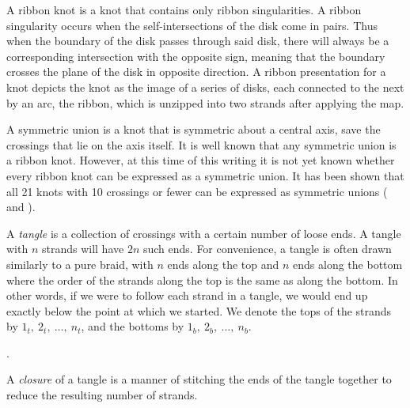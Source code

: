 \begin{paper}

A ribbon knot is a knot that contains only ribbon singularities.
A ribbon singularity occurs when the self-intersections of the disk come in
pairs.
Thus when the boundary of the disk passes through said disk, there will always
be a corresponding intersection with the opposite sign, meaning that the
boundary crosses the plane of the disk in opposite direction.
A ribbon presentation for a knot depicts the knot as the image of a series
of disks, each connected to the next by an arc, the ribbon, which is unzipped
into two strands after applying the map.

A symmetric union is a knot that is symmetric about a central axis, save the
crossings that lie on the axis itself.
It is well known that any symmetric union is a ribbon knot.
However, at this time of this writing it is not yet known whether every ribbon
knot can be expressed as a symmetric union.
It has been shown that all 21 knots with 10 crossings or fewer can be expressed
as symmetric unions (\cite{one} and \cite{many}).


A \textit{tangle} is a collection of crossings with a certain number of loose
ends.
A tangle with $n$ strands will have $2n$ such ends.
For convenience, a tangle is often drawn similarly to a pure braid, with $n$
ends along the top and $n$ ends along the bottom where the order of the strands
along the top is the same as along the bottom.
In other words, if we were to follow each strand in a tangle, we would end up
exactly below the point at which we started.
We denote the tops of the strands by $1_t,~2_t,~\dots,~n_t$, and the
bottoms  by $1_b,~2_b,~\dots,~n_b$.

\columnbreak

\phantom.\vspace{1em}


A \textit{closure} of a tangle is a manner of stitching the ends of the tangle
together to reduce the resulting number of strands.


\end{paper}
